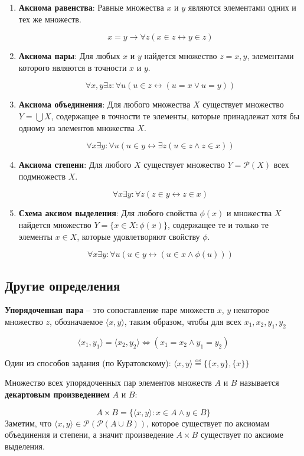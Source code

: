 \begin{enumerate}

\item{\textbf{Аксиома равенства}: Равные множества $x$ и $y$ являются элементами одних и тех же множеств.

$$ x = y \rightarrow \forall z ( x \in z \leftrightarrow y \in z ) $$}

\item{\textbf{Аксиома пары}: Для любых $x$ и $y$ найдется множество $ z = {x, y}$, элементами которого являются в
	точности $x$ и $y$.

$$ \forall x, y \exists z : \forall u (u \in z \leftrightarrow ( u = x \lor u = y)) $$}

\item{\textbf{Аксиома объединения}: Для любого множества $X$ существует множество $Y = \bigcup X$, содержащее в
	точности те элементы, которые принадлежат хотя бы одному из элементов множества $X$.

$$ \forall x \exists y: \forall u ( u \in y \leftrightarrow \exists z (u \in z \land z \in x)) $$}

\item{\textbf{Аксиома степени}: Для любого $X$ существует множество $ Y = \mathcal{P} (X)$ всех подмножеств $X$.

$$ \forall x \exists y : \forall z ( z \in y \leftrightarrow z \in x) $$}

\item{\textbf{Схема аксиом выделения}: Для любого свойства $\phi (x)$ и множества $X$ найдется множество $Y = \{x
	\in X: \phi (x)\}$, содержащее те и только те элементы $x \in X$, которые удовлетворяют свойству $\phi$.

$$ \forall x \exists y: \forall u ( u \in y \leftrightarrow (u \in x \land \phi (u))) $$}

\end{enumerate}

\subsection{Другие определения}

\begin{definition}
	\textbf{Упорядоченная пара} -- это сопоставление паре множеств $x$, $y$ некоторое множество $z$,
обозначаемое $\langle x, y \rangle$, таким образом, чтобы для всех $x_1, x_2, y_1, y_2$

$$ \langle x_1, y_1 \rangle = \langle x_2, y_2 \rangle \Longleftrightarrow (x_1 = x_2 \land y_1 = y_2) $$
\end{definition}
Один из способов задания (по Куратовскому):  $\langle x, y \rangle \overset{\underset{\mathrm{def}}{}}{=} \{\{x,
y\}, \{x\}\}$
\begin{definition}
Множество всех упорядоченных пар элементов множеств $A$ и $B$ называется \textbf{декартовым
произведением} $A$ и $B$:

$$ A \times B = \{\langle x, y \rangle : x \in A \land y \in B\} $$
Заметим, что $\langle x, y \rangle \in \mathcal{P} ( \mathcal{P} ( A \cup B))$, которое существует по аксиомам
объединения и степени, а значит произведение $ A \times B$ существует по аксиоме выделения.
\end{definition}


